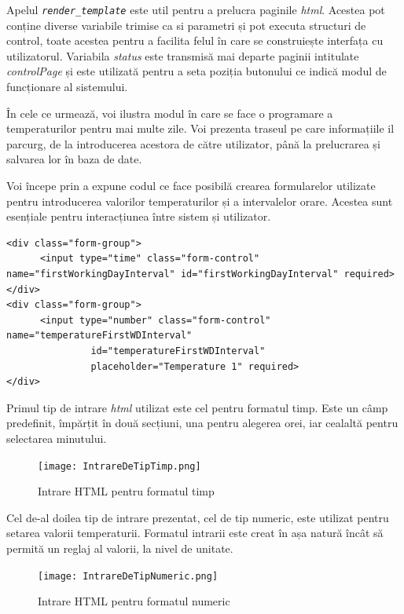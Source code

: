 	Apelul \textit{\texttt{render\_template}} este util pentru a prelucra paginile \textit{html}. Acestea pot conține diverse variabile trimise ca si parametri și pot executa structuri de control, toate acestea pentru a facilita felul în care se construiește interfața cu utilizatorul. Variabila \textit{status} este transmisă mai departe paginii intitulate \textit{controlPage} și este utilizată pentru a seta poziția butonului ce indică modul de funcționare al sistemului.

\vspace{2em}

	În cele ce urmează, voi ilustra modul în care se face o programare a temperaturilor pentru mai multe zile. Voi prezenta traseul pe care informațiile il parcurg, de la introducerea acestora de către utilizator, până la prelucrarea și salvarea lor în baza de date.

	Voi începe prin a expune codul ce face posibilă crearea formularelor utilizate pentru introducerea valorilor temperaturilor și a intervalelor orare. Acestea sunt esențiale pentru interacțiunea între sistem și utilizator.  

\vspace{1em}
\begin{lstlisting}
<div class="form-group">
      <input type="time" class="form-control" name="firstWorkingDayInterval" id="firstWorkingDayInterval" required>
</div>
<div class="form-group">
      <input type="number" class="form-control" name="temperatureFirstWDInterval"
               id="temperatureFirstWDInterval"
               placeholder="Temperature 1" required>
</div>
\end{lstlisting}
\vspace{2em} 

	Primul tip de intrare \textit{html} utilizat este cel pentru formatul timp. Este un câmp predefinit, împărțit în două secțiuni, una pentru alegerea orei, iar cealaltă pentru selectarea minutului.
	
\begin{figure}[H]
   	\centering
    	\texttt{[image: IntrareDeTipTimp.png]}
	\caption{Intrare HTML pentru formatul timp}
\end{figure}

	Cel de-al doilea tip de intrare prezentat, cel de tip numeric, este utilizat pentru setarea valorii temperaturii. Formatul intrarii este creat în așa natură încât să permită un reglaj al valorii, la nivel de unitate.

\begin{figure}[H]
   	\centering
    	\texttt{[image: IntrareDeTipNumeric.png]}
	\caption{Intrare HTML pentru formatul numeric}
\end{figure}

